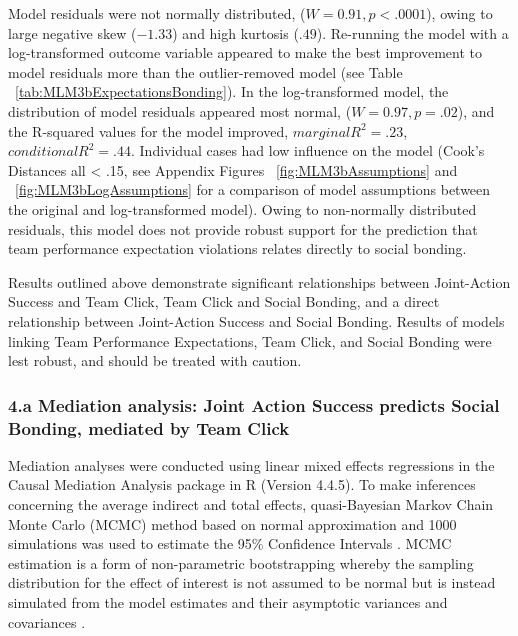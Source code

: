 Model residuals were not normally distributed, ($W = 0.91, p < .0001$), owing to large negative skew ($-1.33$) and high kurtosis ($.49$). Re-running the model with a log-transformed outcome variable appeared to make the best improvement to model residuals more than the outlier-removed model (see Table ~\ref{tab:MLM3bExpectationsBonding}). In the log-transformed model, the distribution of model residuals appeared most normal,  ($W = 0.97, p = .02$), and the R-squared values for the model improved, $marginal R^2 = .23$, $conditional R^2 = .44$.  Individual cases had low influence on the model (Cook's Distances all < .15, see Appendix Figures ~\ref{fig:MLM3bAssumptions} and ~\ref{fig:MLM3bLogAssumptions} for a comparison of model assumptions between the original and log-transformed model). Owing to non-normally distributed residuals, this model does not provide robust support for the prediction that team performance expectation violations relates directly to social bonding.

Results outlined above demonstrate significant relationships between Joint-Action Success and Team Click, Team Click and Social Bonding, and a direct relationship between Joint-Action Success and Social Bonding. Results of models linking Team Performance Expectations, Team Click, and Social Bonding were lest robust, and should be treated with caution.




\restoregeometry



\subsubsection{4.a Mediation analysis: Joint Action Success predicts Social Bonding, mediated by Team Click}
Mediation analyses were conducted using linear mixed effects regressions in the Causal Mediation Analysis package in R (Version 4.4.5).  To make inferences concerning the average indirect and total effects, quasi-Bayesian Markov Chain Monte Carlo (MCMC) method based on normal approximation and 1000 simulations was used to estimate the 95\% Confidence Intervals \citep{Tofighi2016a,Imai2010}. MCMC estimation is a form of non-parametric bootstrapping whereby the sampling distribution for the effect of interest is not assumed to be normal but is instead simulated from the model estimates and their asymptotic variances and covariances \cite{Preacher2008}.

